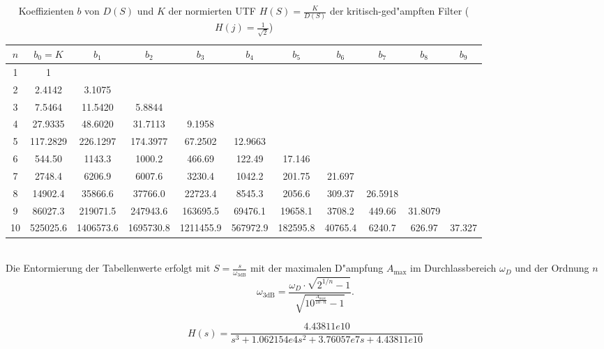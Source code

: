 \begin{table}[!htb]
\begin{center}
{\scriptsize
\begin{tabular}{|c||c|c|c|c|c|c|c|c|c|c| }\hline
$n$ & $b_0=K$ & $b_1$ & $b_2$ & $b_3$ & $b_4$ & $b_5$ & $b_6$ & $b_7$ & $b_8$ & $b_9$ \\ \hline\hline
  1 & 1 & & & & & & & & &   \\ \hline
 2 & 2.4142 & 3.1075 & & & & & & & & \\ \hline
 3 & 7.5464 & 11.5420 & 5.8844 & & & & &  & & \\ \hline
 4 & 27.9335 & 48.6020 & 31.7113 & 9.1958 & & & & & & \\ \hline
 5 & 117.2829 & 226.1297 & 174.3977 & 67.2502 & 12.9663 & & & & &  \\ \hline
 6 & 544.50 & 1143.3 & 1000.2 & 466.69 & 122.49 & 17.146 & & & & \\ \hline  
 7 & 2748.4 & 6206.9 & 6007.6 & 3230.4 & 1042.2 & 201.75 & 21.697 & & &  \\ \hline   
 8 & 14902.4 & 35866.6 & 37766.0 & 22723.4 & 8545.3 & 2056.6 & 309.37 & 26.5918 & & \\ \hline
 9 & 86027.3 & 219071.5 & 247943.6 & 163695.5 & 69476.1 & 19658.1 & 3708.2 & 449.66 & 31.8079 & \\ \hline
 10 & 525025.6 &  1406573.6 & 1695730.8 & 1211455.9 & 567972.9 & 182595.8 & 40765.4 & 6240.7 & 626.97 & 37.327  \\ \hline
\end{tabular}\vspace*{-2mm}\caption{Koeffizienten $b$ von $D(S)$ und $K$ der normierten UTF $H(S)=\frac{K}{D(S)}$ der kritisch-ged"ampften Filter ($H(j)=\frac{1}{\sqrt{2}}$)}
}
\end{center}
\vspace*{-8mm}
\end{table}~\\
Die Entormierung der Tabellenwerte erfolgt mit $S=\frac{s}{\omega_{3\text{dB}}}$ mit der maximalen D"ampfung  $A_{\text{max}}$ im Durchlassbereich $\omega_D$ und der Ordnung $n$
\begin{equation}
\omega_{3\text{dB}}=\frac{\omega_D \cdot{\sqrt{2^{1/n}-1}} }{\sqrt{10^{\frac{A_{\text{max}}}{10\cdot n}}-1}}. 
\end{equation}

\begin{equation*}
H(s)=\frac{4.43811e10}{s^3+ 1.062154e4s^2+    3.76057e7s+    4.43811e10}
\end{equation*}

